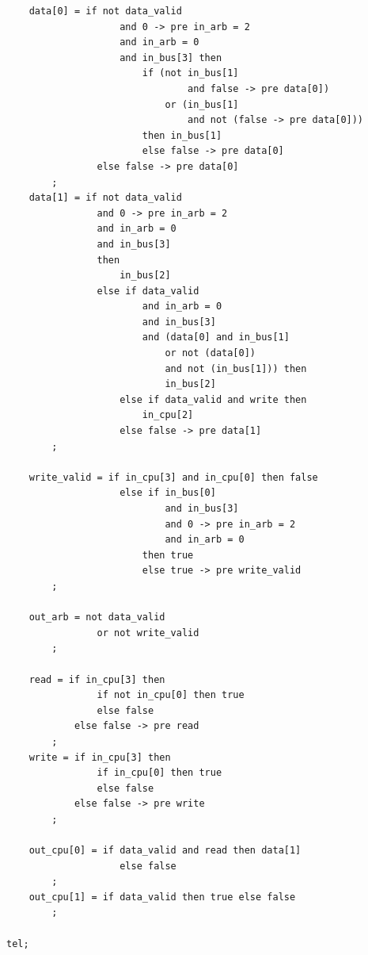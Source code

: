 \documentclass[a4paper,11pt]{report}
\begin{document}
\begin{framed}
\begin{verbatim}
    data[0] = if not data_valid
                    and 0 -> pre in_arb = 2
                    and in_arb = 0
                    and in_bus[3] then
                        if (not in_bus[1] 
                        		and false -> pre data[0])
                            or (in_bus[1] 
                            	and not (false -> pre data[0]))
                        then in_bus[1]
                        else false -> pre data[0]
                else false -> pre data[0]
        ;
    data[1] = if not data_valid
                and 0 -> pre in_arb = 2
                and in_arb = 0
                and in_bus[3]
                then
                    in_bus[2]
                else if data_valid
                        and in_arb = 0
                        and in_bus[3]
                        and (data[0] and in_bus[1]
                        	or not (data[0]) 
                        	and not (in_bus[1])) then
                            in_bus[2]
                    else if data_valid and write then
                        in_cpu[2]
                    else false -> pre data[1]
        ;

    write_valid = if in_cpu[3] and in_cpu[0] then false
                    else if in_bus[0]
                            and in_bus[3]
                            and 0 -> pre in_arb = 2
                            and in_arb = 0
                        then true
                        else true -> pre write_valid
        ;

    out_arb = not data_valid
                or not write_valid
        ;

    read = if in_cpu[3] then
                if not in_cpu[0] then true
                else false
            else false -> pre read
        ;
    write = if in_cpu[3] then
                if in_cpu[0] then true
                else false
            else false -> pre write
        ;

    out_cpu[0] = if data_valid and read then data[1]
                    else false
        ;
    out_cpu[1] = if data_valid then true else false
        ;

tel;

		\end{verbatim}
	\end{framed}
\end{document}
